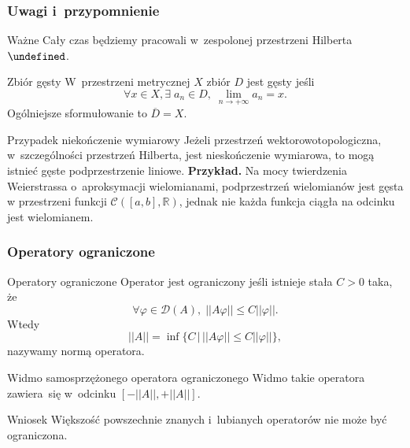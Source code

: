 \documentclass{beamer} \mode<presentation>
\newcommand{\tb}{\textbf}
\newcommand{\ol}{\overline}
\newcommand{\mb}{\mathbb}
\newcommand{\mc}{\mathcal}
\newcommand{\ra}{\rightarrow}
\newcommand{\vp}{\varphi}
\newcommand{\R}{\mb{R}}
\newcommand{\D}{\mc{D}}
\let\H\undefined
\newcommand{\H}{\mc{H}}
\newcommand{\Cc}{\mc{C}}
\newcommand{\Lim}{\lim\limits}
\newcommand{\norm}[1]{\left|\left| #1 \right|\right|}
\begin{document}
\begin{frame}
  \frametitle{Uwagi i~przypomnienie}

  \begin{block}{Ważne}
    Cały czas będziemy pracowali w~zespolonej przestrzeni Hilberta
    $\H$.
  \end{block}

  \begin{block}{Zbiór gęsty}
    W~przestrzeni metrycznej $X$ zbiór $D$ jest gęsty jeśli
    \begin{equation}
      \label{eq:EC}
      \forall x \in X, \exists \; a_{ n } \in D, \; \Lim_{ n \ra +\infty}
      a_{ n } = x.
    \end{equation}
    Ogólniejsze sformułowanie to $\ol{ D } = X$.
  \end{block}

  \begin{block}{Przypadek niekończenie wymiarowy}
    Jeżeli przestrzeń wektorowo\dywiz topologiczna, w~szczególności
    przestrzeń Hilberta, jest nieskończenie wymiarowa, to mogą istnieć
    gęste podprzestrzenie liniowe. \tb{Przykład.} Na mocy twierdzenia
    Weierstrassa o~aproksymacji wielomianami, podprzestrzeń
    wielomianów jest gęsta w przestrzeni funkcji
    $\Cc( [ a, b ], \R )$, jednak nie każda funkcja ciągła na odcinku
    jest wielomianem.
  \end{block}
  
\end{frame}



\begin{frame}
  \frametitle{Operatory ograniczone}

  \begin{block}{Operatory ograniczone}
    Operator jest ograniczony jeśli istnieje stała $C > 0$ taka, że
    \begin{equation}
      \label{eq:5}
      \forall \vp \in \D(A), \; \norm{ A \vp } \leq C \norm{ \vp }.
    \end{equation}
    Wtedy
    \begin{equation}
      \label{eq:3}
      \norm{ A } = \inf\{ C \, | \, \norm{ A \vp } \leq C \norm{ \vp } \},
    \end{equation}
    nazywamy normą operatora.
  \end{block}

  \begin{block}{Widmo samosprzężonego operatora ograniczonego}
    Widmo takie operatora zawiera~się w~odcinku
    $[ -\norm{ A }, +\norm{ A }]$. \\
  \end{block}

  \begin{block}{Wniosek}
    Większość powszechnie znanych i~lubianych operatorów nie może być
    ograniczona.
  \end{block}
  
\end{frame}
\end{document}
